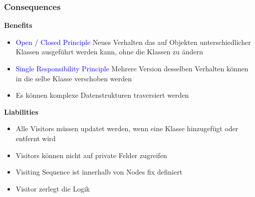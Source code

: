 \subsubsection{Consequences}
\textbf{Benefits}
\begin{itemize}
    \item \textcolor{blue}{Open / Closed Principle} Neues Verhalten das auf Objekten unterschiedlicher Klassen ausgeführt werden kann, ohne die Klassen zu ändern
    \item \textcolor{blue}{Single Responsibility Principle} Mehrere Version desselben Verhalten können in die selbe Klasse verschoben werden
    \item Es können komplexe Datenstrukturen traversiert werden
\end{itemize}
\vspace{10pt}
\textbf{Liabilities}
\begin{itemize}
    \item Alle Visitors müssen updatet werden, wenn eine Klasse hinzugefügt oder entfernt wird
    \item Visitors können nicht auf private Felder zugreifen
    \item Visiting Sequence ist innerhalb von Nodes fix definiert
    \item Visitor zerlegt die Logik
\end{itemize}
